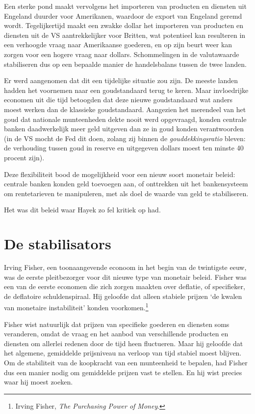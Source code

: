 \documentclass[
  a5paper,
  smalldemyvopaper,11pt,twoside,onecolumn,openright,extrafontsizes,
hidelinks]{memoir}
\begin{document}
Een sterke pond maakt vervolgens het importeren van producten en
diensten uit Engeland duurder voor Amerikanen, waardoor de export van
Engeland geremd wordt. Tegelijkertijd maakt een zwakke dollar het
importeren van producten en diensten uit de VS aantrekkelijker voor
Britten, wat potentieel kan resulteren in een verhoogde vraag naar
Amerikaanse goederen, en op zijn beurt weer kan zorgen voor een hogere
vraag naar dollars. Schommelingen in de valutawaarde stabiliseren dus op
een bepaalde manier de handelsbalans tussen de twee landen.

Er werd aangenomen dat dit een tijdelijke situatie zou zijn. De meeste
landen hadden het voornemen naar een goudstandaard terug te keren. Maar
invloedrijke economen uit die tijd betoogden dat deze nieuwe
goudstandaard wat anders moest werken dan de klassieke goudstandaard.
Aangezien het merendeel van het goud dat nationale munteenheden dekte
nooit werd opgevraagd, konden centrale banken daadwerkelijk meer geld
uitgeven dan ze in goud konden verantwoorden (in de VS mocht de Fed dit
doen, zolang zij binnen de \emph{gouddekkingsratio} bleven: de
verhouding tussen goud in reserve en uitgegeven dollars moest ten minste
40 procent zijn).

Deze flexibiliteit bood de mogelijkheid voor een nieuw soort monetair
beleid: centrale banken konden geld toevoegen aan, of onttrekken uit het
bankensysteem om rentetarieven te manipuleren, met als doel de waarde
van geld te stabiliseren.

Het was dit beleid waar Hayek zo fel kritiek op had.

\section{De stabilisators}\label{de-stabilisators}

Irving Fisher, een toonaangevende econoom in het begin van de twintigste
eeuw, was de eerste pleitbezorger voor dit nieuwe type van monetair
beleid. Fisher was een van de eerste economen die zich zorgen maakten
over deflatie, of specifieker, de deflatoire schuldenspiraal. Hij
geloofde dat alleen stabiele prijzen `de kwalen van monetaire
instabiliteit' konden voorkomen.\footnote{\hspace{0pt}Irving Fisher,
  \emph{The Purchasing Power of Money}.}

Fisher wist natuurlijk dat prijzen van specifieke goederen en diensten
soms veranderen, omdat de vraag en het aanbod van verschillende
producten en diensten om allerlei redenen door de tijd heen fluctueren.
Maar hij geloofde dat het algemene, gemiddelde prijsniveau na verloop
van tijd stabiel moest blijven. Om de stabiliteit van de koopkracht van
een munteenheid te bepalen, had Fisher dus een manier nodig om
gemiddelde prijzen vast te stellen. En hij wist precies waar hij moest
zoeken.
\end{document}

